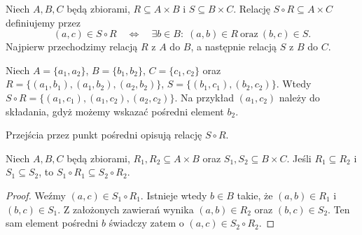 \begin{definicja}\label{def:relation-composition}
Niech $A,B,C$ będą zbiorami, $R\subseteq A\times B$
i $S\subseteq B\times C$. Relację
$S\circ R\subseteq A\times C$ definiujemy przez
\[
(a,c)\in S\circ R\quad\Longleftrightarrow\quad
\exists b\in B:\;(a,b)\in R\ \text{oraz}\ (b,c)\in S.
\]
Najpierw przechodzimy relacją $R$ z $A$ do $B$,
a następnie relacją $S$ z $B$ do $C$.
\end{definicja}

\begin{przyklad}
Niech $A=\{a_1,a_2\}$, $B=\{b_1,b_2\}$,
$C=\{c_1,c_2\}$ oraz
$R=\{(a_1,b_1),(a_1,b_2),(a_2,b_2)\}$,
$S=\{(b_1,c_1),(b_2,c_2)\}$.
Wtedy
$S\circ R=\{(a_1,c_1),(a_1,c_2),(a_2,c_2)\}$.
Na przykład $(a_1,c_2)$ należy do składania, gdyż
możemy wskazać pośredni element $b_2$.
\end{przyklad}

\begin{center}

{\small Przejścia przez punkt pośredni opisują relację $S\circ R$.}
\end{center}

\begin{lemat}
\label{lem:composition-monotone}
Niech $A,B,C$ będą zbiorami, $R_1,R_2\subseteq A\times B$
oraz $S_1,S_2\subseteq B\times C$. Jeśli
$R_1\subseteq R_2$ i $S_1\subseteq S_2$,
to $S_1\circ R_1\subseteq S_2\circ R_2$.
\end{lemat}
\begin{proof}
Weźmy $(a,c)\in S_1\circ R_1$. Istnieje wtedy $b\in B$
takie, że $(a,b)\in R_1$ i $(b,c)\in S_1$.
Z założonych zawierań wynika $(a,b)\in R_2$
oraz $(b,c)\in S_2$. Ten sam element pośredni $b$
świadczy zatem o $(a,c)\in S_2\circ R_2$.
\end{proof}


